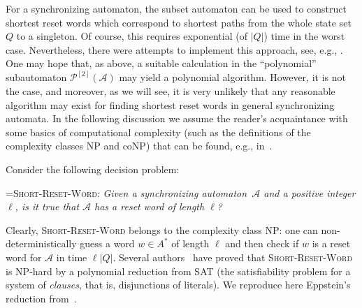 \documentclass{irmaart}
\newcommand{\sa}{synchronizing au\-tom\-a\-ta}
\newcommand{\san}{synchronizing au\-tom\-a\-ton}
\theoremstyle{plain}
\begin{document}
For a \san, the subset automaton can be used to construct shortest
reset words which correspond to shortest paths from the whole
state set $Q$ to a singleton. Of course, this requires exponential
(of $|Q|$) time in the worst case. Nevertheless, there were
attempts to implement this approach, see, e.g.,
\cite{Rho&Somenzi&Pixley:1993,Trahtman:2006}. One may hope that,
as above, a suitable calculation in the ``polynomial''
subautomaton $\mathcal{P}^{[2]}(\mathcal{A})$ may yield a
polynomial algorithm. However, it is not the case, and moreover,
as we will see, it is very unlikely that any reasonable algorithm
may exist for finding shortest reset words in general \sa. In the
following discussion we assume the reader's acquaintance with some
basics of computational complexity (such as the definitions of the
complexity classes \textsf{NP} and \textsf{coNP}) that can be
found, e.g., in~\cite{Garey&Johnson:1979,Papadimitriou:1994}.

Consider the following decision
problem:

\smallskip

\hangindent=\parindent \noindent\textsc{Short-Reset-Word:}
\emph{Given a \san\ $\mathcal{A}$ and a positive integer $\ell$,
is it true that $\mathcal{A}$ has a reset word of length $\ell$?}

\smallskip

Clearly, \textsc{Short-Reset-Word} belongs to the complexity class
\textsf{NP}: one can non-deterministically guess a word $w\in A^*$
of length $\ell$ and then check if $w$ is a reset word for
$\mathcal{A}$ in time $\ell|Q|$. Several
authors~\cite{Rystsov:1980,Eppstein:1990,Goralcik&Koubek:1995,Salomaa:2003,Samotij:2007}
have proved that \textsc{Short-Reset-Word} is \textsf{NP}-hard by
a polynomial reduction from \textsc{SAT} (the satisfiability
problem for a system of \emph{clauses}, that is, disjunctions of
literals). We reproduce here Eppstein's reduction
from~\cite{Eppstein:1990}.
\end{document}
